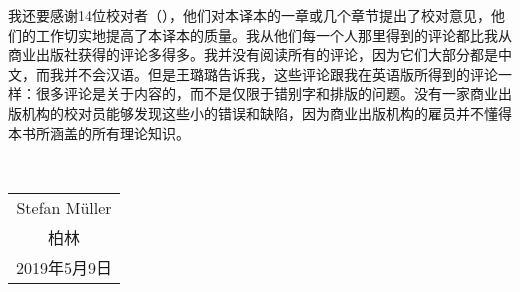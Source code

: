 我还要感谢14位校对者（\makeatletter\@proofreader\makeatother），他们对本译本的一章或几个章节提出了校对意见，他们的工作切实地提高了本译本的质量。我从他们每一个人那里得到的评论都比我从商业出版社获得的评论多得多。我并没有阅读所有的评论，因为它们大部分都是中文，而我并不会汉语。但是王璐璐告诉我，这些评论跟我在英语版所得到的评论一样：很多评论是关于内容的，而不是仅限于错别字和排版的问题。没有一家商业出版机构的校对员能够发现这些小的错误和缺陷，因为商业出版机构的雇员并不懂得本书所涵盖的所有理论知识。

~\medskip

\noindent
\begin{flushright}
\begin{tabular}{c}
Stefan Müller\\
柏林\\
2019年5月9日\\
\end{tabular}
\end{flushright}

